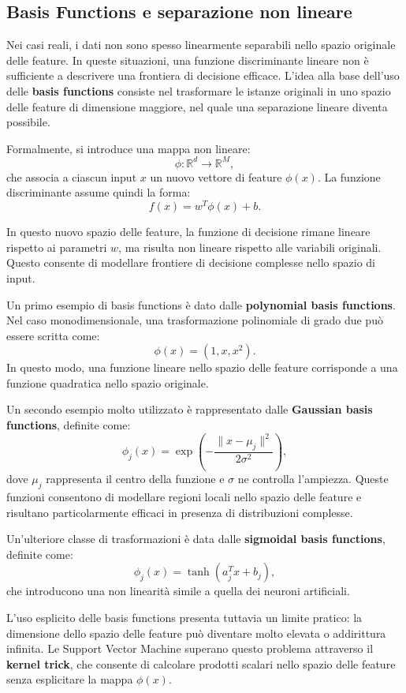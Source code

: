\documentclass[a4paper,12pt]{report}
\begin{document}
\subsection{Basis Functions e separazione non lineare}

Nei casi reali, i dati non sono spesso linearmente separabili nello spazio originale delle feature.
In queste situazioni, una funzione discriminante lineare non è sufficiente a descrivere una frontiera di decisione efficace.
L’idea alla base dell’uso delle \textbf{basis functions} consiste nel trasformare le istanze originali in uno spazio delle feature di dimensione maggiore, nel quale una separazione lineare diventa possibile.

Formalmente, si introduce una mappa non lineare:
\[
\phi : \mathbb{R}^d \rightarrow \mathbb{R}^M,
\]
che associa a ciascun input \( x \) un nuovo vettore di feature \( \phi(x) \).
La funzione discriminante assume quindi la forma:
\[
f(x) = w^T \phi(x) + b.
\]

In questo nuovo spazio delle feature, la funzione di decisione rimane lineare rispetto ai parametri \( w \), ma risulta non lineare rispetto alle variabili originali.
Questo consente di modellare frontiere di decisione complesse nello spazio di input.

Un primo esempio di basis functions è dato dalle \textbf{polynomial basis functions}.
Nel caso monodimensionale, una trasformazione polinomiale di grado due può essere scritta come:
\[
\phi(x) = (1, x, x^2).
\]
In questo modo, una funzione lineare nello spazio delle feature corrisponde a una funzione quadratica nello spazio originale.

Un secondo esempio molto utilizzato è rappresentato dalle \textbf{Gaussian basis functions}, definite come:
\[
\phi_j(x) = \exp\left( -\frac{\|x - \mu_j\|^2}{2\sigma^2} \right),
\]
dove \( \mu_j \) rappresenta il centro della funzione e \( \sigma \) ne controlla l’ampiezza.
Queste funzioni consentono di modellare regioni locali nello spazio delle feature e risultano particolarmente efficaci in presenza di distribuzioni complesse.

Un’ulteriore classe di trasformazioni è data dalle \textbf{sigmoidal basis functions}, definite come:
\[
\phi_j(x) = \tanh(a_j^T x + b_j),
\]
che introducono una non linearità simile a quella dei neuroni artificiali.

L’uso esplicito delle basis functions presenta tuttavia un limite pratico: la dimensione dello spazio delle feature può diventare molto elevata o addirittura infinita.
Le Support Vector Machine superano questo problema attraverso il \textbf{kernel trick}, che consente di calcolare prodotti scalari nello spazio delle feature senza esplicitare la mappa \( \phi(x) \).
\end{document}
